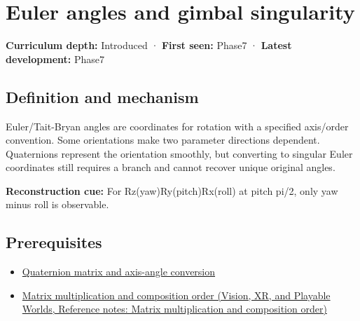 \hypertarget{appendix-5f723fbd0593}{}\label{referencestart:appendix-5f723fbd0593}
\section{Euler angles and gimbal singularity}\label{appendix-5f723fbd0593-euler-angles-and-gimbal-singularity}

\hypertarget{appendix-5f723fbd0593-euler-angles-and-gimbal-singularity}{}

\textbf{Curriculum depth:} Introduced · \textbf{First seen:} Phase7 · \textbf{Latest development:} Phase7

\begin{allmightroledefinition}

\subsection{Definition and mechanism}\label{appendix-5f723fbd0593-definition-and-mechanism}

\hypertarget{appendix-5f723fbd0593-definition-and-mechanism}{}

Euler/Tait-Bryan angles are coordinates for rotation with a specified axis/order convention. Some orientations make two parameter directions dependent. Quaternions represent the orientation smoothly, but converting to singular Euler coordinates still requires a branch and cannot recover unique original angles.

\end{allmightroledefinition}

\textbf{Reconstruction cue:} For Rz(yaw)Ry(pitch)Rx(roll) at pitch pi/2, only yaw minus roll is observable.

\subsection{Prerequisites}\label{appendix-5f723fbd0593-prerequisites}

\hypertarget{appendix-5f723fbd0593-prerequisites}{}

\begin{itemize}
\tightlist
\item
  \hyperref[appendix-26d8da71f6c4]{Quaternion matrix and axis-angle conversion}
\item
  \href{../07-Vision-XR-and-Playable-Worlds/main.pdf\#nameddest=appendix-ab31ef447dbf}{Matrix multiplication and composition order (Vision, XR, and Playable Worlds, Reference notes: Matrix multiplication and composition order)}
\end{itemize}

